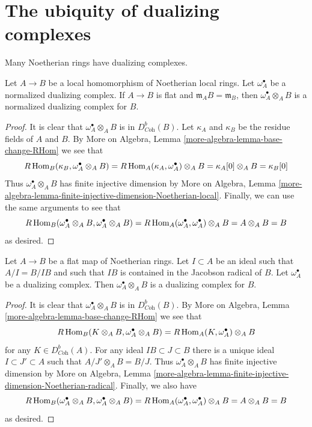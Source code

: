 \section{The ubiquity of dualizing complexes}
\label{section-ubiquity-dualizing}

\noindent
Many Noetherian rings have dualizing complexes.

\begin{lemma}
\label{lemma-flat-unramified}
Let $A \to B$ be a local homomorphism of Noetherian local rings.
Let $\omega_A^\bullet$ be a normalized dualizing complex.
If $A \to B$ is flat and $\mathfrak m_A B = \mathfrak m_B$,
then $\omega_A^\bullet \otimes_A B$ is a normalized dualizing
complex for $B$.
\end{lemma}

\begin{proof}
It is clear that $\omega_A^\bullet \otimes_A B$ is in $D^b_{\textit{Coh}}(B)$.
Let $\kappa_A$ and $\kappa_B$ be the residue fields of $A$ and $B$.
By More on Algebra, Lemma \ref{more-algebra-lemma-base-change-RHom}
we see that
$$
R\mathop{\mathrm{Hom}}\nolimits_B(\kappa_B, \omega_A^\bullet \otimes_A B) =
R\mathop{\mathrm{Hom}}\nolimits_A(\kappa_A, \omega_A^\bullet) \otimes_A B =
\kappa_A[0] \otimes_A B = \kappa_B[0]
$$
Thus $\omega_A^\bullet \otimes_A B$ has finite injective dimension by
More on Algebra, Lemma
\ref{more-algebra-lemma-finite-injective-dimension-Noetherian-local}.
Finally, we can use the same arguments to see that
$$
R\mathop{\mathrm{Hom}}\nolimits_B(\omega_A^\bullet \otimes_A B, \omega_A^\bullet \otimes_A B) =
R\mathop{\mathrm{Hom}}\nolimits_A(\omega_A^\bullet, \omega_A^\bullet) \otimes_A B = A \otimes_A B = B
$$
as desired.
\end{proof}

\begin{lemma}
\label{lemma-flat-iso-mod-I}
Let $A \to B$ be a flat map of Noetherian rings. Let
$I \subset A$ be an ideal such that $A/I = B/IB$ and
such that $IB$ is contained in the Jacobson radical of $B$.
Let $\omega_A^\bullet$ be a dualizing complex.
Then $\omega_A^\bullet \otimes_A B$ is a dualizing
complex for $B$.
\end{lemma}

\begin{proof}
It is clear that $\omega_A^\bullet \otimes_A B$ is in $D^b_{\textit{Coh}}(B)$.
By More on Algebra, Lemma \ref{more-algebra-lemma-base-change-RHom}
we see that
$$
R\mathop{\mathrm{Hom}}\nolimits_B(K \otimes_A B, \omega_A^\bullet \otimes_A B) =
R\mathop{\mathrm{Hom}}\nolimits_A(K, \omega_A^\bullet) \otimes_A B
$$
for any $K \in D^b_{\textit{Coh}}(A)$. For any ideal
$IB \subset J \subset B$ there is a unique ideal $I \subset J' \subset A$
such that $A/J' \otimes_A B = B/J$. Thus $\omega_A^\bullet \otimes_A B$
has finite injective dimension by
More on Algebra, Lemma
\ref{more-algebra-lemma-finite-injective-dimension-Noetherian-radical}.
Finally, we also have
$$
R\mathop{\mathrm{Hom}}\nolimits_B(\omega_A^\bullet \otimes_A B, \omega_A^\bullet \otimes_A B) =
R\mathop{\mathrm{Hom}}\nolimits_A(\omega_A^\bullet, \omega_A^\bullet) \otimes_A B = A \otimes_A B = B
$$
as desired.
\end{proof}

